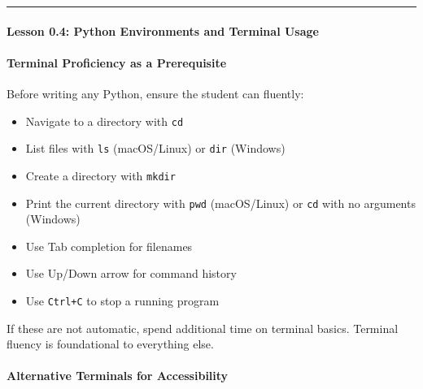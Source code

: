 \documentclass[
  justified,
  openright,
]{tufte-book}
\let\subsubsection\paragraph
\let\paragraph\paragraph
\let\subsubsection\paragraph
\let\paragraph\paragraph
\providecommand{\tightlist}{%
  \setlength{\itemsep}{0pt}\setlength{\parskip}{0pt}}
\begin{document}
\begin{center}\rule{0.5\linewidth}{0.5pt}\end{center}

\subsubsection{Lesson 0.4: Python Environments and Terminal
Usage}\label{lesson-0.4-python-environments-and-terminal-usage}

\paragraph{Terminal Proficiency as a
Prerequisite}\label{terminal-proficiency-as-a-prerequisite}

Before writing any Python, ensure the student can fluently:

\begin{itemize}
\tightlist
\item
  Navigate to a directory with \texttt{cd}
\item
  List files with \texttt{ls} (macOS/Linux) or \texttt{dir} (Windows)
\item
  Create a directory with \texttt{mkdir}
\item
  Print the current directory with \texttt{pwd} (macOS/Linux) or
  \texttt{cd} with no arguments (Windows)
\item
  Use Tab completion for filenames
\item
  Use Up/Down arrow for command history
\item
  Use \texttt{Ctrl+C} to stop a running program
\end{itemize}

If these are not automatic, spend additional time on terminal basics.
Terminal fluency is foundational to everything else.

\paragraph{Alternative Terminals for
Accessibility}\label{alternative-terminals-for-accessibility}
\end{document}
